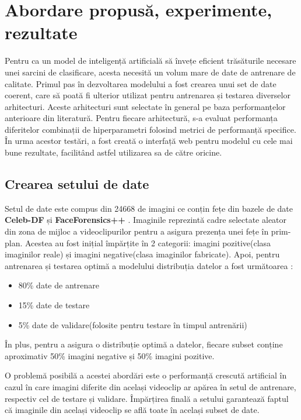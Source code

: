 \chapter{Abordare propusă, experimente, rezultate}
\label{Capitolul 5}

Pentru ca un model de inteligență artificială să învețe eficient trăsăturile necesare unei sarcini de clasificare, acesta necesită un volum mare de date de antrenare de calitate. Primul pas în dezvoltarea modelului a fost crearea unui set de date coerent, care să poată fi ulterior utilizat pentru antrenarea și testarea diverselor arhitecturi. Aceste arhitecturi sunt selectate în general pe baza performanțelor anterioare din literatură. Pentru fiecare arhitectură, s-a evaluat performanța diferitelor combinații de hiperparametri folosind metrici de performanță specifice. În urma acestor testări, a fost creată o interfață web pentru modelul cu cele mai bune rezultate, facilitând astfel utilizarea sa de către oricine. 

\section{Crearea setului de date}

Setul de date este compus din 24668 de imagini ce conțin fețe din bazele de date \textbf{Celeb-DF}\cite{li2020celeb} și \textbf{FaceForensics++} \cite{rössler2019faceforensics}. Imaginile reprezintă cadre selectate aleator din zona de mijloc a videoclipurilor pentru a asigura prezența unei fețe în prim-plan. Acestea au fost inițial împărțite în 2 categorii: imagini pozitive(clasa imaginilor reale) și imagini negative(clasa imaginilor fabricate). Apoi, pentru antrenarea și testarea optimă a modelului distribuția datelor a fost următoarea : 

\begin{itemize}
    \item 80\% date de antrenare 
    \item 15\% date de testare
    \item 5\% date de validare(folosite pentru testare în timpul antrenării)
\end{itemize}

În plus, pentru a asigura o distribuție optimă a datelor, fiecare subset conține aproximativ 50\% imagini negative și 50\% imagini pozitive. 

O problemă posibilă a acestei abordări este o performanță crescută artificial în cazul în care imagini diferite din același videoclip ar apărea în setul de antrenare, respectiv cel de testare și validare. Împărțirea finală a setului garantează faptul că imaginile din același videoclip se află toate în același subset de date. 

